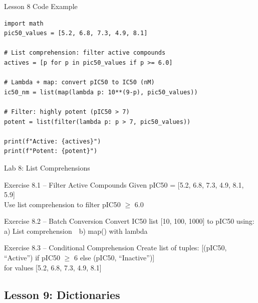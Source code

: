 \documentclass{beamer}
\begin{document}
\begin{frame}[fragile]{Lesson 8 Code Example}
    \small
    \begin{lstlisting}[style=codeStyle]
import math
pic50_values = [5.2, 6.8, 7.3, 4.9, 8.1]

# List comprehension: filter active compounds
actives = [p for p in pic50_values if p >= 6.0]

# Lambda + map: convert pIC50 to IC50 (nM)
ic50_nm = list(map(lambda p: 10**(9-p), pic50_values))

# Filter: highly potent (pIC50 > 7)
potent = list(filter(lambda p: p > 7, pic50_values))

print(f"Active: {actives}")
print(f"Potent: {potent}")
    \end{lstlisting}
\end{frame}

\begin{frame}{\textcolor{labcolor}{Lab 8: List Comprehensions}}
    \footnotesize
    \begin{block}{Exercise 8.1 -- Filter Active Compounds}
        Given pIC50 = [5.2, 6.8, 7.3, 4.9, 8.1, 5.9]\\
        Use list comprehension to filter pIC50 $\geq$ 6.0
    \end{block}
    \vspace{0.2em}
    \begin{block}{Exercise 8.2 -- Batch Conversion}
        Convert IC50 list [10, 100, 1000] to pIC50 using:\\
        a) List comprehension\ \ b) map() with lambda
    \end{block}
    \vspace{0.2em}
    \begin{block}{Exercise 8.3 -- Conditional Comprehension}
        Create list of tuples: [(pIC50, ``Active'') if pIC50 $\geq$ 6 else (pIC50, ``Inactive'')]\\
        for values [5.2, 6.8, 7.3, 4.9, 8.1]
    \end{block}
\end{frame}

\subsection{Lesson 9: Dictionaries}
\end{document}
